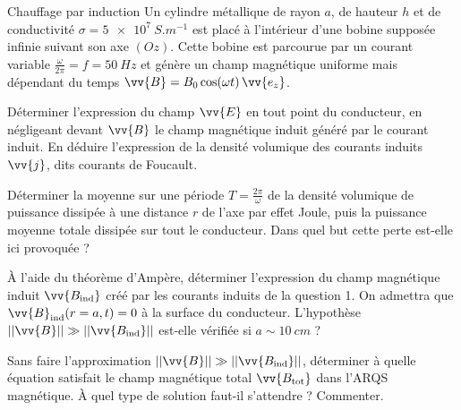   
\begin{exo}[PC][1][colle]{Chauffage par induction}
Un cylindre métallique de rayon $a$, de hauteur $h$ et de conductivité $\sigma=\SI{5e7}{S.m^{-1}}$ est placé à l'intérieur d'une bobine supposée infinie suivant son axe $(Oz)$. Cette bobine est parcourue par un courant variable $\frac{\omega}{2\pi}=f=\SI{50}{Hz}$ et génère un champ magnétique uniforme mais dépendant du temps $\vv{B}=B_{0}\cos(\omega t)\,\vv{e_z}$.
\begin{quest}
\item Déterminer l'expression du champ $\vv{E}$ en tout point du conducteur, en négligeant devant $\vv{B}$ le champ magnétique induit généré par le courant induit. En déduire l'expression de la densité volumique des courants induits $\vv{j}$, dits courants de Foucault.
\item Déterminer la moyenne sur une période $T=\frac{2\pi}{\omega}$ de la densité volumique de puissance dissipée à une distance $r$ de l'axe par effet Joule, puis la puissance moyenne totale dissipée sur tout le conducteur. Dans quel but cette perte est-elle ici provoquée ?
\item À l'aide du théorème d'Ampère, déterminer l'expression du champ magnétique induit $\vv{B_{\rm{ind}}}$ créé par les courants induits de la question 1. On admettra que $\vv{B}_{\rm{ind}}(r=a,t)=0$ à la surface du conducteur. L'hypothèse $||\vv{B}||\gg||\vv{B_{\rm{ind}}}||$ est-elle vérifiée si $a\sim\SI{10}{cm}$ ?
\item Sans faire l'approximation $||\vv{B}||\gg||\vv{B_{\rm{ind}}}||$, déterminer à quelle équation satisfait le champ magnétique total $\vv{B_{\rm{tot}}}$ dans l'ARQS magnétique. À quel type de solution faut-il s'attendre ? Commenter.
\end{quest}
\end{exo}


